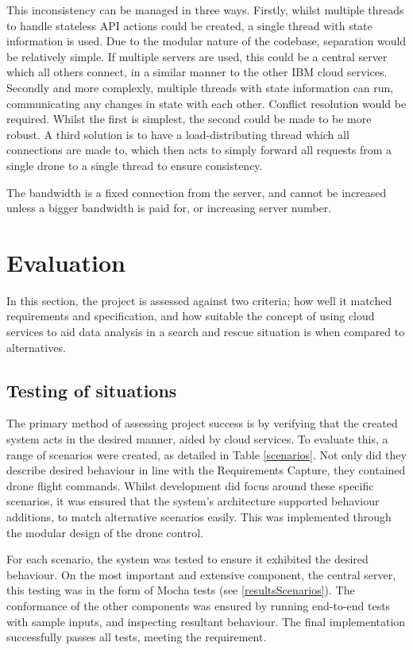 \documentclass{article}
\begin{document}
This inconsistency can be managed in three ways. Firstly, whilst multiple threads to handle stateless API actions could be created, a single thread with state information is used. Due to the modular nature of the codebase, separation would be relatively simple. If multiple servers are used, this could be a central server which all others connect, in a similar manner to the other IBM cloud services. Secondly and more complexly, multiple threads with state information can run, communicating any changes in state with each other. Conflict resolution would be required. Whilst the first is simplest, the second could be made to be more robust. A third solution is to have a load-distributing thread which all connections are made to, which then acts to simply forward all requests from a single drone to a single thread to ensure consistency. 

The bandwidth is a fixed connection from the server, and cannot be increased unless a bigger bandwidth is paid for, or increasing server number.


\section{Evaluation}
In this section, the project is assessed against two criteria; how well it matched requirements and specification, and how suitable the concept of using cloud services to aid data analysis in a search and rescue situation is when compared to alternatives.
 
\subsection{Testing of situations}
The primary method of assessing project success is by verifying that the created system acts in the desired manner, aided by cloud services. To evaluate this, a range of scenarios were created, as detailed in Table \ref{scenarios}. Not only did they describe desired behaviour in line with the Requirements Capture, they contained drone flight commands. Whilst development did focus around these specific scenarios, it was ensured that the system's architecture supported behaviour additions, to match alternative scenarios easily. This was implemented through the modular design of the drone control.

For each scenario, the system was tested to ensure it exhibited the desired behaviour. On the most important and extensive component, the central server, this testing was in the form of Mocha tests (see \ref{resultsScenarios}). The conformance of the other components was ensured by running end-to-end tests with sample inputs, and inspecting resultant behaviour. The final implementation successfully passes all tests, meeting the requirement. 
\end{document}
